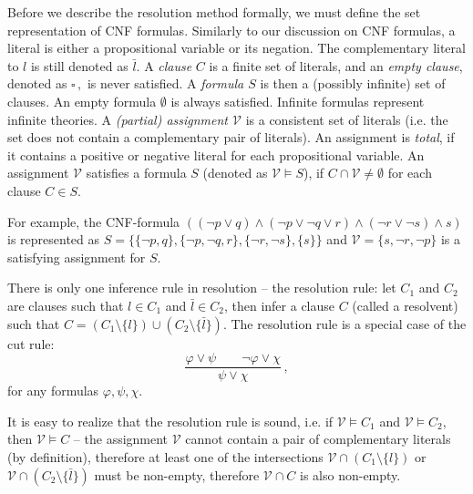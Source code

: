 Before we describe the resolution method formally, we must define the set representation of CNF formulas. Similarly to our discussion on CNF formulas, a literal is either a propositional variable or its negation. The complementary literal to $l$ is still denoted as $\bar{l}$. A \emph{clause} $C$ is a finite set of literals, and an \emph{empty clause}, denoted as $\square\,,$ is never satisfied. A \emph{formula $S$} is then a (possibly infinite) set of clauses. An empty formula $\emptyset$ is always satisfied. Infinite formulas represent infinite theories. A \emph{(partial) assignment $\mathcal{V}$} is a consistent set of literals (i.e. the set does not contain a complementary pair of literals). An assignment is \emph{total}, if it contains a positive or negative literal for each propositional variable. An assignment $\mathcal{V}$ satisfies a formula $S$ (denoted as $\mathcal{V} \vDash S$), if $C \cap \mathcal{V} \neq \emptyset$ for each clause $C \in S$.

For example, the CNF-formula $((\neg p \lor q) \land (\neg p \lor \neg q \lor r) \land (\neg r \lor \neg s) \land s)$ is represented as $S = \{\{\neg p, q\}, \{\neg p, \neg q, r\}, \{\neg r, \neg s\}, \{s\}\}$ and $\mathcal{V} = \{s, \neg r, \neg p\}$ is a satisfying assignment for $S$.


There is only one inference rule in resolution -- the resolution rule: let $C_1$ and $C_2$ are clauses such that $l \in C_1$ and $\bar{l} \in C_2$, then infer a clause $C$ (called a resolvent) such that $C = (C_1 \setminus \{l\}) \cup (C_2 \setminus \{\bar{l}\})$. The resolution rule is a special case of the cut rule: $$\frac{\varphi \lor \psi \qquad \neg \varphi \lor \chi}{\psi \lor \chi}\,,$$ for any formulas $\varphi, \psi, \chi$. 

It is easy to realize that the resolution rule is sound, i.e. if $\mathcal{V} \vDash C_1$ and $\mathcal{V} \vDash C_2$, then $\mathcal{V} \vDash C$ -- the assignment $\mathcal{V}$ cannot contain a pair of complementary literals (by definition), therefore at least one of the intersections $\mathcal{V} \cap (C_1 \setminus \{l\})$ or $\mathcal{V} \cap (C_2 \setminus \{\bar{l}\})$ must be non-empty, therefore $\mathcal{V} \cap C$ is also non-empty.

